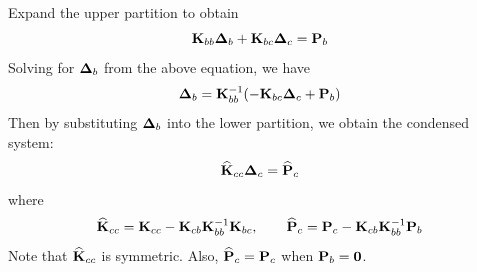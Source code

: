 Expand the upper partition to obtain
\begin{equation*}
  \mathbf{K}_{bb}\bm{\Delta}_b + \mathbf{K}_{bc}\bm{\Delta}_c = \mathbf{P}_b
\end{equation*}
Solving for $\bm{\Delta}_b$ from the above equation, we have
\begin{equation*}
  \bm{\Delta}_b = \mathbf{K}_{bb}^{-1}(-\mathbf{K}_{bc}\bm{\Delta}_c + \mathbf{P}_b)
\end{equation*}
Then by substituting $\bm{\Delta}_b$ into the lower partition, we obtain the condensed system:
\begin{equation}
  \widehat{\mathbf{K}}_{cc}\bm{\Delta}_c = \widehat{\mathbf{P}}_c
\end{equation}
where
\begin{equation}
  \widehat{\mathbf{K}}_{cc} = \mathbf{K}_{cc} - \mathbf{K}_{cb}\mathbf{K}_{bb}^{-1}\mathbf{K}_{bc},\qquad
  \widehat{\mathbf{P}}_c = \mathbf{P}_c - \mathbf{K}_{cb}\mathbf{K}_{bb}^{-1}\mathbf{P}_b
\end{equation}
Note that $\widehat{\mathbf{K}}_{cc}$ is symmetric. Also, $\widehat{\mathbf{P}}_c = \mathbf{P}_c$ when $\mathbf{P}_b = \mathbf{0}$.

